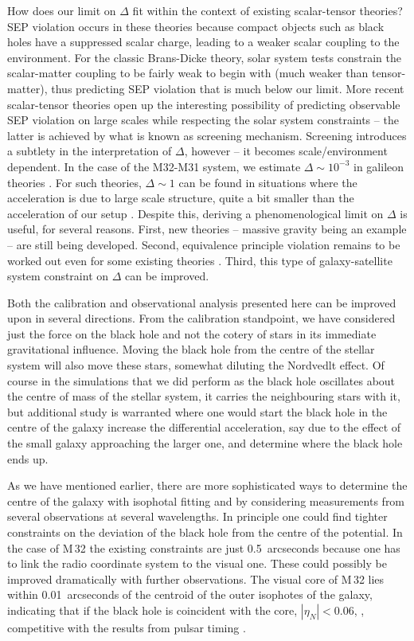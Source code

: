 \documentclass[useAMS,usenatbib]{mn2e}
\begin{document}
How does our limit on $\Delta$ fit within the context of
existing scalar-tensor theories? SEP violation occurs in these
theories because compact objects such as black holes have
a suppressed scalar charge, leading to a weaker
scalar coupling to the environment. For the classic Brans-Dicke
theory, solar system tests constrain the scalar-matter coupling
to be fairly weak to begin with (much weaker than tensor-matter),
thus predicting SEP violation that is much below our limit.
More recent scalar-tensor theories open up the interesting possibility
of predicting observable SEP violation on large scales while
respecting the solar system constraints -- the latter is achieved by
what is known as screening mechanism. Screening introduces
a subtlety in the interpretation of $\Delta$, however -- it becomes scale/environment
dependent. In the case of the M32-M31 system, we estimate $\Delta \sim 10^{-3}$
in galileon theories \citep{2009PhRvD..79f4036N}. 
For such theories, $\Delta \sim 1$ can
be found in situations where the acceleration is due to large scale
structure, quite a bit smaller than the acceleration of our setup
\citep{2012PhRvL.109e1304H}. 
Despite this, deriving a phenomenological limit on $\Delta$ is useful, 
for several reasons.
First, new theories -- massive gravity being an example -- are still
being developed. Second, equivalence principle violation remains
to be worked out even for some existing theories
\citep{2009PhRvD..80j4002H}.
Third, this type of galaxy-satellite system constraint on $\Delta$ 
can be improved.

Both the calibration and observational analysis presented here can be
improved upon in several directions.  From the calibration standpoint,
we have 
considered
just the force on the black hole and not the cotery
of stars in its immediate gravitational influence.  Moving the black
hole from the centre of the stellar system will also move these stars,
somewhat 
diluting 
the Nordvedlt effect.  Of course in the simulations
that we did perform as the black hole oscillates about the centre of
mass of the stellar system, it carries the neighbouring stars with it,
but additional study is warranted where one would start the black hole
in the centre of the galaxy increase the differential acceleration,
say due to the effect of the small galaxy 
approaching 
the larger one,
and determine where the black hole ends up.

As we have mentioned earlier, there are more sophisticated ways to
determine the centre of the galaxy with isophotal fitting and by
considering measurements from several observations at several
wavelengths.  In 
principle 
one could find tighter constraints on the
deviation of the black hole from the centre of the potential.  In the
case of M\,32 the existing constraints are just 0.5~arcseconds because
one has to link the radio coordinate system to the visual one.  These
could possibly be improved dramatically with further observations.
The visual core of M\,32 lies within 0.01~arcseconds of the centroid
of the outer isophotes of the galaxy, indicating that if the black
hole is coincident with the core, $|\eta_N|<0.06$, , competitive with the
results from pulsar timing \citep{Stairs:2005}.
\end{document}
